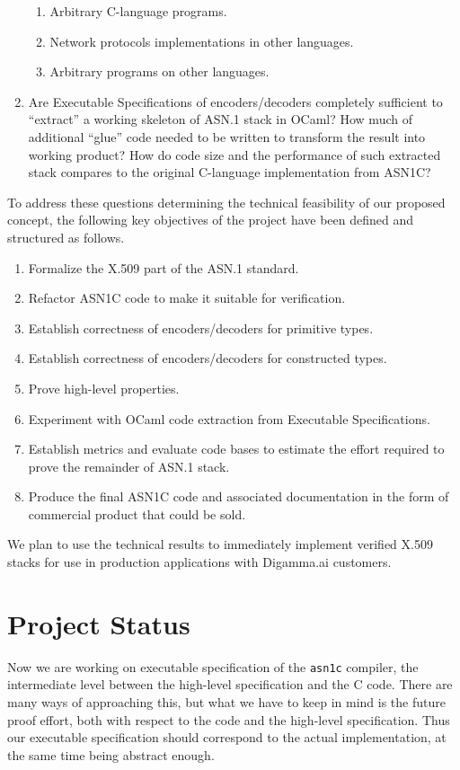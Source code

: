\documentclass[acmsmall,nonacm]{acmart}
\begin{document}
\begin{enumerate}
\begin{enumerate}
    \item Arbitrary C-language programs.
    \item Network protocols implementations in other languages.
    \item Arbitrary programs on other languages.
    \end{enumerate}
  \item Are Executable Specifications of encoders/decoders completely sufficient to “extract” a working skeleton of ASN.1 stack in OCaml? How much of additional ``glue'' code needed to be written to transform the result into working product? How do code size and the performance of such extracted stack compares to the original C-language implementation from ASN1C?  
\end{enumerate}

To address these questions determining the technical feasibility of
our proposed concept, the following key objectives of the project have
been defined and structured as follows.

\begin{enumerate}
\item Formalize the X.509 part of the ASN.1 standard.     
\item Refactor ASN1C code to make it suitable for verification.
\item Establish correctness of encoders/decoders for primitive types.
\item Establish correctness of encoders/decoders for constructed types.
\item Prove high-level properties.
\item Experiment with OCaml code extraction from Executable Specifications.
\item Establish metrics and evaluate code bases to estimate the effort required to prove the remainder of ASN.1 stack.
\item Produce the final ASN1C code and associated documentation in the form of commercial product that could be sold.
\end{enumerate}

We plan to use the technical results to immediately implement verified
X.509 stacks for use in production applications with Digamma.ai
customers.
 
\section{Project Status}

Now we are working on executable specification of the \texttt{asn1c}
compiler, the intermediate level between the high-level specification
and the C code. There are many ways of approaching this, but what we
have to keep in mind is the future proof effort, both with respect to
the code and the high-level specification. Thus our executable
specification should correspond to the actual implementation, at the
same time being abstract enough.
\end{document}
